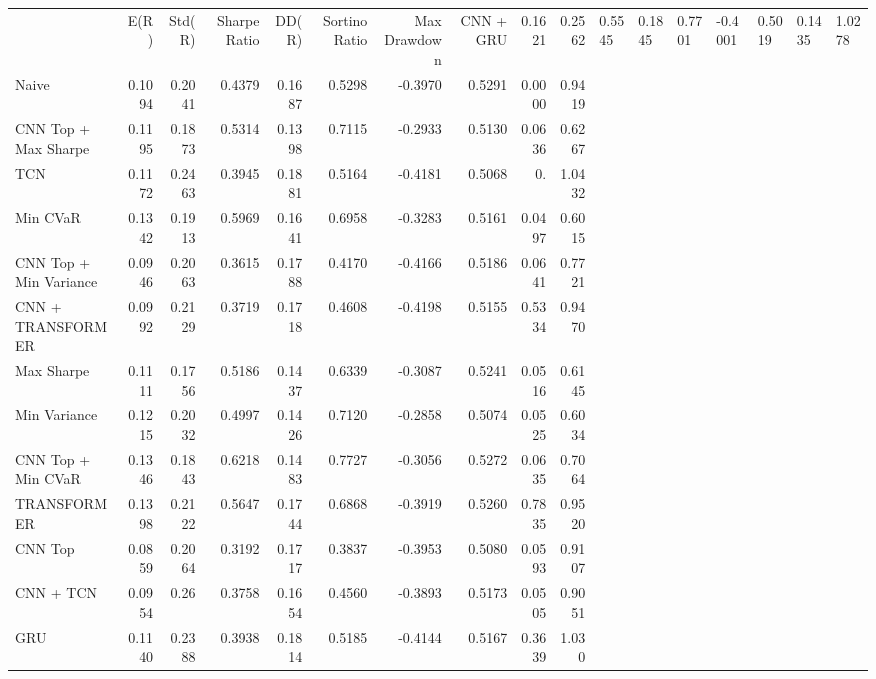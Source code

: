 \begin{tabular}{lrrrrrrrrr}
\toprule
 & E(R) & Std(R) & Sharpe Ratio & DD(R) & Sortino Ratio & Max Drawdown & %
\midrule
CNN + GRU & 0.1621 & 0.2562 & 0.5545 & 0.1845 & 0.7701 & -0.4001 & 0.5019 & 0.1435 & 1.0278 \\
Naive & 0.1094 & 0.2041 & 0.4379 & 0.1687 & 0.5298 & -0.3970 & 0.5291 & 0.0000 & 0.9419 \\
CNN Top + Max Sharpe & 0.1195 & 0.1873 & 0.5314 & 0.1398 & 0.7115 & -0.2933 & 0.5130 & 0.0636 & 0.6267 \\
TCN & 0.1172 & 0.2463 & 0.3945 & 0.1881 & 0.5164 & -0.4181 & 0.5068 & 0. & 1.0432 \\
Min CVaR & 0.1342 & 0.1913 & 0.5969 & 0.1641 & 0.6958 & -0.3283 & 0.5161 & 0.0497 & 0.6015 \\
CNN Top + Min Variance & 0.0946 & 0.2063 & 0.3615 & 0.1788 & 0.4170 & -0.4166 & 0.5186 & 0.0641 & 0.7721 \\
CNN + TRANSFORMER & 0.0992 & 0.2129 & 0.3719 & 0.1718 & 0.4608 & -0.4198 & 0.5155 & 0.5334 & 0.9470 \\
Max Sharpe & 0.1111 & 0.1756 & 0.5186 & 0.1437 & 0.6339 & -0.3087 & 0.5241 & 0.0516 & 0.6145 \\
Min Variance & 0.1215 & 0.2032 & 0.4997 & 0.1426 & 0.7120 & -0.2858 & 0.5074 & 0.0525 & 0.6034 \\
CNN Top + Min CVaR & 0.1346 & 0.1843 & 0.6218 & 0.1483 & 0.7727 & -0.3056 & 0.5272 & 0.0635 & 0.7064 \\
TRANSFORMER & 0.1398 & 0.2122 & 0.5647 & 0.1744 & 0.6868 & -0.3919 & 0.5260 & 0.7835 & 0.9520 \\
CNN Top & 0.0859 & 0.2064 & 0.3192 & 0.1717 & 0.3837 & -0.3953 & 0.5080 & 0.0593 & 0.9107 \\
CNN + TCN & 0.0954 & 0.26 & 0.3758 & 0.1654 & 0.4560 & -0.3893 & 0.5173 & 0.0505 & 0.9051 \\
GRU & 0.1140 & 0.2388 & 0.3938 & 0.1814 & 0.5185 & -0.4144 & 0.5167 & 0.3639 & 1.030 \\
\bottomrule
\end{tabular}
